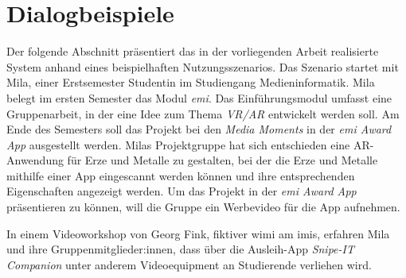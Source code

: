 \chapter{Dialogbeispiele}
\label{chapter-dialogbeispiel}
Der folgende Abschnitt präsentiert das in der vorliegenden Arbeit realisierte
System anhand eines beispielhaften Nutzungsszenarios. Das Szenario startet mit
Mila, einer Erstsemester Studentin im Studiengang Medieninformatik. Mila belegt
im ersten Semester das Modul \textit{\ac{emi}}. Das Einführungsmodul umfasst
eine Gruppenarbeit, in der eine Idee  zum Thema \textit{VR/AR} entwickelt werden
soll. Am Ende des Semesters soll das Projekt bei den \textit{Media Moments} in
der \textit{\ac{emi} Award App} \cite{canzler2022} ausgestellt werden.
Milas Projektgruppe hat sich entschieden eine AR-Anwendung für Erze und Metalle
zu gestalten, bei der die Erze und Metalle mithilfe einer App eingescannt werden
können und ihre entsprechenden Eigenschaften angezeigt werden. Um das Projekt in
der \textit{\ac{emi} Award App} präsentieren zu können, will die Gruppe ein
Werbevideo für die App aufnehmen.

In einem Videoworkshop von Georg Fink, fiktiver \ac{wimi} am \ac{imis}, erfahren
Mila und ihre Gruppenmitglieder:innen, dass über die Ausleih-App
\textit{Snipe-IT Companion} unter anderem Videoequipment an Studierende
verliehen wird.

